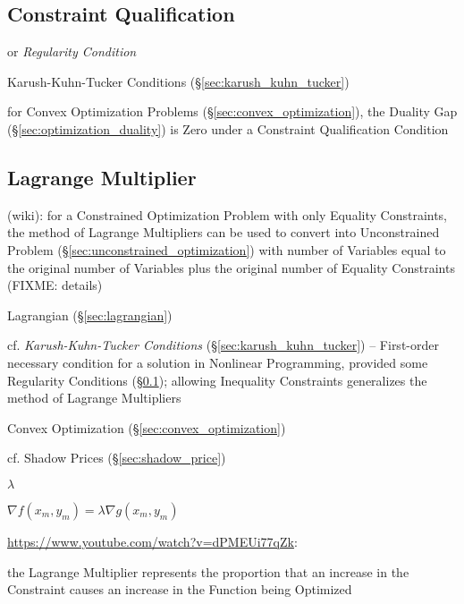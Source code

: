 \subsection{Constraint Qualification}\label{sec:constraint_qualification}

or \emph{Regularity Condition}

\fist Karush-Kuhn-Tucker Conditions (\S\ref{sec:karush_kuhn_tucker})

for Convex Optimization Problems (\S\ref{sec:convex_optimization}), the Duality
Gap (\S\ref{sec:optimization_duality}) is Zero under a Constraint Qualification
Condition



\subsection{Lagrange Multiplier}\label{sec:lagrange_multiplier}

(wiki): for a Constrained Optimization Problem with only Equality Constraints,
the method of Lagrange Multipliers can be used to convert into Unconstrained
Problem (\S\ref{sec:unconstrained_optimization}) with number of Variables equal
to the original number of Variables plus the original number of Equality
Constraints (FIXME: details)

\fist Lagrangian (\S\ref{sec:lagrangian})

\fist cf. \emph{Karush-Kuhn-Tucker Conditions} (\S\ref{sec:karush_kuhn_tucker})
-- First-order necessary condition for a solution in Nonlinear Programming,
provided some Regularity Conditions (\S\ref{sec:constraint_qualification});
allowing Inequality Constraints generalizes the method of Lagrange Multipliers

\fist Convex Optimization (\S\ref{sec:convex_optimization})

cf. Shadow Prices (\S\ref{sec:shadow_price})

$\lambda$

$\nabla f(x_m, y_m) = \lambda\nabla g(x_m, y_m)$

\url{https://www.youtube.com/watch?v=dPMEUi77qZk}:

the Lagrange Multiplier represents the proportion that an increase in the
Constraint causes an increase in the Function being Optimized

